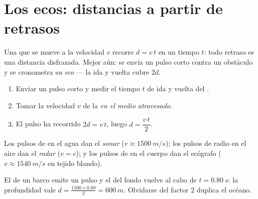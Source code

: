 \section{Los ecos: distancias a partir de retrasos}

Una  que se mueve a la velocidad $v$ recorre $d = v\,t$ en un
tiempo $t$: todo retraso es una distancia disfrazada. Mejor aún: se
envía un pulso corto contra un obstáculo y se cronometra su
\emph{eco} --- la ida y vuelta cubre $2d$.

\begin{method}\label{met:g10:signals-and-waves:echo}
\begin{enumerate}
  \item Enviar un pulso corto y medir el tiempo $t$ de ida y vuelta del
        .
  \item Tomar la velocidad $v$ de la  \emph{en el medio
        atravesado}.
  \item El pulso ha recorrido $2d = v\,t$, luego
        $d = \dfrac{v\,t}{2}$.
\end{enumerate}
Los pulsos de  en el agua dan el \emph{sonar}
($v \approx \qty{1500}{m/s}$); los pulsos de radio en el aire dan el
\emph{radar} ($v = c$); y los pulsos de  en el
cuerpo dan el ecógrafo ($v \approx \qty{1540}{m/s}$ en tejido blando).
\end{method}

\begin{example}[El sonar]\label{ex:g10:signals-and-waves:sonar}
El  de un barco emite un pulso y el  del fondo vuelve al cabo de
$t = \qty{0.80}{s}$: la profundidad vale
$d = \frac{1500 \times 0.80}{2} = \qty{600}{m}$. Olvidarse del factor
$2$ duplica el océano.
\end{example}


